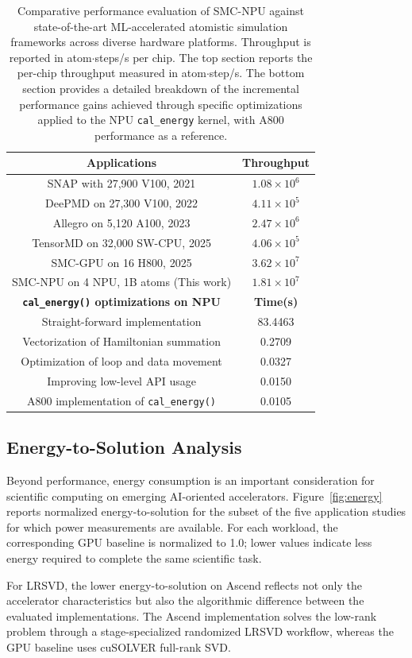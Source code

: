 \documentclass{article}
\newcommand{\rev}[1]{#1}
\begin{document}
\begin{table}
  \centering
  \caption{Comparative performance evaluation of SMC-NPU against state-of-the-art ML-accelerated atomistic simulation frameworks across diverse hardware platforms. \rev{Throughput is reported in atom$\cdot$steps/s per chip.} The top section reports the per-chip throughput measured in atom$\cdot$step/s. The bottom section provides a detailed breakdown of the incremental performance gains achieved through specific optimizations applied to the NPU \texttt{cal\_energy} kernel, with A800 performance as a reference.}
  \label{tab:opt}
    \begin{tabular}{c|c}
\hline
\hline
\textbf{Applications} & \textbf{Throughput} \\
\hline
SNAP with 27,900 V100, 2021 \cite{10.1145/3458817.3487400} & $1.08 \times 10^{6}$
\\
DeePMD on 27,300 V100, 2022 \cite{10.1145/3503221.3508425} & $4.11 \times 10^{5}$
\\
Allegro on 5,120 A100, 2023 \cite{10.1145/3581784.3627041} & ${2.47 \times 10^{6}}$ \\
TensorMD on 32,000 SW-CPU, 2025 \cite{10880101} & $4.06 \times 10^{5}$ \\
SMC-GPU on 16 H800, 2025 \cite{doi:10.1021/acs.jctc.5c01614} & $3.62 \times 10^{7}$ \\
SMC-NPU on 4 NPU, 1B atoms (This work) & ${{1.81 \times 10^{7}}}$\\
\hline
\textbf{\texttt{cal\_energy()} optimizations on NPU} & \textbf{Time(s)} \\
\hline
Straight-forward implementation & 83.4463 \\
Vectorization of Hamiltonian summation & 0.2709 \\
Optimization of loop and data movement & 0.0327 \\
Improving low-level API usage & 0.0150\\
\textrm{A800 implementation of \texttt{cal\_energy()}} & 0.0105\\
\hline
    \end{tabular}
\end{table}


\subsection{Energy-to-Solution Analysis}

\rev{
Beyond performance, energy consumption is an important consideration for
scientific computing on emerging AI-oriented accelerators. Figure~\ref{fig:energy}
reports normalized energy-to-solution for the subset of the five application
studies for which power measurements are available. For each workload, the corresponding
GPU baseline is normalized to 1.0; lower values indicate less energy required
to complete the same scientific task.
} \rev{
For LRSVD, the lower energy-to-solution on Ascend reflects not only the
accelerator characteristics but also the algorithmic difference between
the evaluated implementations. The Ascend implementation solves the
low-rank problem through a stage-specialized randomized LRSVD workflow,
whereas the GPU baseline uses cuSOLVER full-rank SVD.
}
\end{document}
